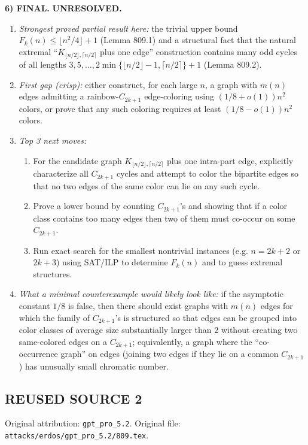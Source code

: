 \medskip
\noindent\textbf{6) FINAL.} \textbf{UNRESOLVED.}

\begin{enumerate}
\item[(i)] \emph{Strongest proved partial result here:} the trivial upper bound $F_k(n)\le \lfloor n^2/4\rfloor+1$ (Lemma 809.1) and a structural fact that the natural extremal ``$K_{\lfloor n/2\rfloor,\lceil n/2\rceil}$ plus one edge'' construction contains many odd cycles of all lengths $3,5,\dots,2\min\{\lfloor n/2\rfloor-1,\lceil n/2\rceil\}+1$ (Lemma 809.2).
\item[(ii)] \emph{First gap (crisp):} either construct, for each large $n$, a graph with $m(n)$ edges admitting a rainbow-$C_{2k+1}$ edge-coloring using $(1/8+o(1))n^2$ colors, or prove that any such coloring requires at least $(1/8-o(1))n^2$ colors.
\item[(iii)] \emph{Top 3 next moves:}
  \begin{enumerate}
  \item For the candidate graph $K_{\lfloor n/2\rfloor,\lceil n/2\rceil}$ plus one intra-part edge, explicitly characterize all $C_{2k+1}$ cycles and attempt to color the bipartite edges so that no two edges of the same color can lie on any such cycle.
  \item Prove a lower bound by counting $C_{2k+1}$'s and showing that if a color class contains too many edges then two of them must co-occur on some $C_{2k+1}$.
  \item Run exact search for the smallest nontrivial instances (e.g. $n=2k+2$ or $2k+3$) using SAT/ILP to determine $F_k(n)$ and to guess extremal structures.
  \end{enumerate}
\item[(iv)] \emph{What a minimal counterexample would likely look like:} if the asymptotic constant $1/8$ is false, then there should exist graphs with $m(n)$ edges for which the family of $C_{2k+1}$'s is structured so that edges can be grouped into color classes of average size substantially larger than $2$ without creating two same-colored edges on a $C_{2k+1}$; equivalently, a graph where the ``co-occurrence graph'' on edges (joining two edges if they lie on a common $C_{2k+1}$) has unusually small chromatic number.
\end{enumerate}




\subsection*{REUSED SOURCE 2}
Original attribution: \texttt{gpt\_pro\_5.2}.
Original file: \texttt{attacks/erdos/gpt\_pro\_5.2/809.tex}.

